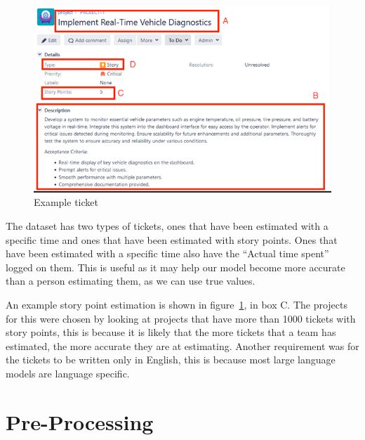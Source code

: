 \documentclass{UoYCSproject}
\begin{document}
    \begin{figure}[h]
        \includegraphics[width=\textwidth]{./figures/dummy-ticket}
        \caption{Example ticket}
        \label{fig:ticket}
    \end{figure}

    The dataset has two types of tickets, ones that have been estimated with a specific time and ones that have been estimated with story points.
    Ones that have been estimated with a specific time also have the ``Actual time spent'' logged on them.
    This is useful as it may help our model become more accurate than a person estimating them, as we can use true values. \par
    An example story point estimation is shown in figure~\ref{fig:ticket}, in box C.
    The projects for this were chosen by looking at projects that have more than 1000 tickets with story points, this is because it is likely that the more tickets that a team has estimated, the more accurate they are at estimating.
    Another requirement was for the tickets to be written only in English, this is because most large language models are language specific.


    \section{Pre-Processing}\label{sec:preprocessing}
\end{document}
